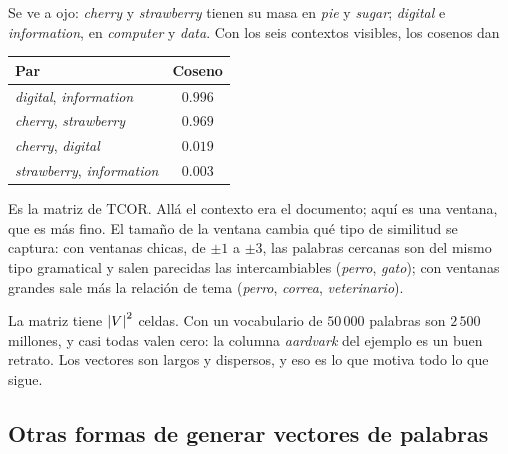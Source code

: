 \documentclass[11pt,letterpaper]{article}
\begin{document}
Se ve a ojo: \textit{cherry} y \textit{strawberry} tienen su masa en
\textit{pie} y \textit{sugar}; \textit{digital} e
\textit{information}, en \textit{computer} y \textit{data}. Con los
seis contextos visibles, los cosenos dan

\begin{center}
\begin{tabular}{lc}
    \toprule
    \textbf{Par} & \textbf{Coseno} \\
    \midrule
    \textit{digital}, \textit{information} & $0.996$ \\
    \textit{cherry}, \textit{strawberry}   & $0.969$ \\
    \textit{cherry}, \textit{digital}      & $0.019$ \\
    \textit{strawberry}, \textit{information} & $0.003$ \\
    \bottomrule
\end{tabular}
\end{center}

\begin{observacion}
    Es la matriz de TCOR. Allá el contexto era el documento; aquí es
    una ventana, que es más fino. El tamaño de la ventana cambia qué
    tipo de similitud se captura: con ventanas chicas, de $\pm 1$ a
    $\pm 3$, las palabras cercanas son del mismo tipo gramatical y
    salen parecidas las intercambiables (\textit{perro},
    \textit{gato}); con ventanas grandes sale más la relación de tema
    (\textit{perro}, \textit{correa}, \textit{veterinario}).
\end{observacion}

\begin{ojo}
    La matriz tiene $\left\lvert V \right\rvert^2$ celdas. Con un vocabulario de $50\,000$
    palabras son $2\,500$ millones, y casi todas valen cero: la columna
    \textit{aardvark} del ejemplo es un buen retrato. Los vectores son
    largos y dispersos, y eso es lo que motiva todo lo que sigue.
\end{ojo}


\subsection*{Otras formas de generar vectores de palabras}
\end{document}
